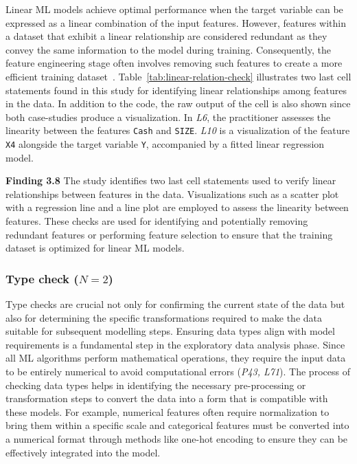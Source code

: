 \documentclass[smallextended]{svjour3}       %
\newcommand{\highlight}[1]{\begin{framed}%
  \noindent#1
\end{framed}}
\begin{document}
Linear ML models achieve optimal performance when the target variable can be expressed as a linear combination of the input features. However, features within a dataset that exhibit a linear relationship are considered redundant as they convey the same information to the model during training. Consequently, the feature engineering stage often involves removing such features to create a more efficient training dataset~\citep{shome2022data}. Table~\ref{tab:linear-relation-check} illustrates two last cell statements found in this study for identifying linear relationships among features in the data. In addition to the code, the raw output of the cell is also shown since both case-studies produce a visualization.  In \emph{L6}, the practitioner assesses the linearity between the features \texttt{Cash} and \texttt{SIZE}. \emph{L10} is a visualization of the feature \texttt{X4} alongside the target variable \texttt{Y}, accompanied by a fitted linear regression model.

\highlight{\textbf{Finding 3.8} The study identifies two last cell statements used to verify linear relationships between features in the data. Visualizations such as a scatter plot with a regression line and a line plot are employed to assess the linearity between features. These checks are used for identifying and potentially removing redundant features or performing feature selection to ensure that the training dataset is optimized for linear ML models.}

\subsubsection{Type check ($N = 2$)}

Type checks are crucial not only for confirming the current state of the data but also for determining the specific transformations required to make the data suitable for subsequent modelling steps. Ensuring data types align with model requirements is a fundamental step in the exploratory data analysis phase. Since all ML algorithms perform mathematical operations, they require the input data to be entirely numerical to avoid computational errors (\emph{P43, L71}). The process of checking data types helps in identifying the necessary pre-processing or transformation steps to convert the data into a form that is compatible with these models. For example, numerical features often require normalization to bring them within a specific scale and categorical features must be converted into a numerical format through methods like one-hot encoding to ensure they can be effectively integrated into the model.
\end{document}
